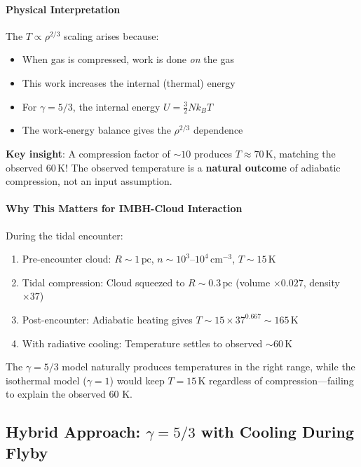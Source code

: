 \documentclass[11pt,a4paper]{article}
\newcommand{\pc}{\,\mathrm{pc}}
\newcommand{\cmcubed}{\,\mathrm{cm^{-3}}}
\begin{document}
\paragraph{Physical Interpretation}
The $T \propto \rho^{2/3}$ scaling arises because:
\begin{itemize}
    \item When gas is compressed, work is done \textit{on} the gas
    \item This work increases the internal (thermal) energy
    \item For $\gamma = 5/3$, the internal energy $U = \frac{3}{2} N k_B T$
    \item The work-energy balance gives the $\rho^{2/3}$ dependence
\end{itemize}

\textbf{Key insight}: A compression factor of $\sim 10$ produces $T \approx 70\,\mathrm{K}$,
matching the observed $60\,\mathrm{K}$! The observed temperature is a \textbf{natural outcome}
of adiabatic compression, not an input assumption.

\paragraph{Why This Matters for IMBH-Cloud Interaction}
During the tidal encounter:
\begin{enumerate}
    \item Pre-encounter cloud: $R \sim 1\pc$, $n \sim 10^3$--$10^4\cmcubed$, $T \sim 15\,\mathrm{K}$
    \item Tidal compression: Cloud squeezed to $R \sim 0.3\pc$ (volume $\times 0.027$, density $\times 37$)
    \item Post-encounter: Adiabatic heating gives $T \sim 15 \times 37^{0.667} \sim 165\,\mathrm{K}$
    \item With radiative cooling: Temperature settles to observed $\sim 60\,\mathrm{K}$
\end{enumerate}

The $\gamma = 5/3$ model naturally produces temperatures in the right range,
while the isothermal model ($\gamma = 1$) would keep $T = 15\,\mathrm{K}$ regardless
of compression---failing to explain the observed 60 K.

\subsection{Hybrid Approach: $\gamma = 5/3$ with Cooling During Flyby}
\label{sec:hybrid_cooling}
\end{document}
